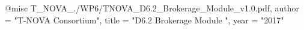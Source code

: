 @misc{ T_NOVA_./WP6/TNOVA_D6.2_Brokerage_Module_v1.0.pdf,
       author = "T-NOVA Consortium",
       title = "D6.2 Brokerage Module ",
       year = "2017" }
